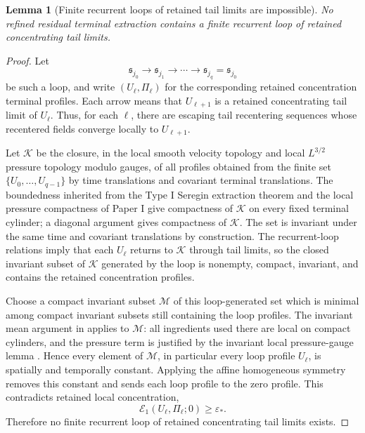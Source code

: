 \documentclass[11pt]{amsart}
\numberwithin{equation}{section}
\theoremstyle{plain}
\newtheorem{lemma}[theorem]{Lemma}
\theoremstyle{definition}
\theoremstyle{remark}
\newcommand{\eps}{\varepsilon}
\newcommand{\calE}{\mathcal E}
\newcommand{\calM}{\mathcal M}
\newcommand{\calK}{\mathcal K}
\begin{document}
\begin{lemma}[Finite recurrent loops of retained tail limits are impossible]
\label{lem:no-finite-recurrent-cycle}
No refined residual terminal extraction contains a finite recurrent loop of retained
concentrating tail limits.
\end{lemma}

\begin{proof}
Let
\[
   \mathfrak s_{j_0}\to\mathfrak s_{j_1}\to\cdots
   \to\mathfrak s_{j_q}=\mathfrak s_{j_0}
\]
be such a loop, and write \((U_\ell,\Pi_\ell)\) for the corresponding retained
concentration terminal profiles.  Each arrow means that \(U_{\ell+1}\) is a
retained concentrating tail limit of \(U_\ell\).  Thus, for each \(\ell\), there are escaping
tail recentering sequences whose recentered fields converge locally to \(U_{\ell+1}\).

Let \(\calK\) be the closure, in the local smooth velocity topology and local
\(L^{3/2}\) pressure topology modulo gauges, of all profiles obtained from the
finite set \(\{U_0,\dots,U_{q-1}\}\) by time translations and covariant
terminal translations.  The boundedness inherited from the Type I Seregin
extraction theorem and the local pressure compactness of Paper I give compactness of
\(\calK\) on every fixed terminal cylinder; a diagonal argument gives compactness
of \(\calK\).  The set is invariant under the same time and covariant
translations by construction.  The recurrent-loop relations imply that each \(U_\ell\)
returns to \(\calK\) through tail limits, so the closed invariant subset of
\(\calK\) generated by the loop is nonempty, compact, invariant, and contains
the retained concentration profiles.

Choose a compact invariant subset \(\calM\) of this loop-generated set which
is minimal among compact invariant subsets still containing the loop profiles.
The invariant mean argument in
 applies to \(\calM\): all ingredients
used there are local on compact cylinders, and the pressure term is justified
by the invariant local pressure-gauge lemma
.  Hence every element of \(\calM\),
in particular every loop profile \(U_\ell\), is spatially and temporally
constant.  Applying the affine homogeneous symmetry
 removes this constant and sends each loop profile to
the zero profile.  This contradicts retained local concentration,
\[
   \calE_1(U_\ell,\Pi_\ell;0)\ge\eps_* .
\]
Therefore no finite recurrent loop of retained concentrating tail limits exists.
\end{proof}
\end{document}

